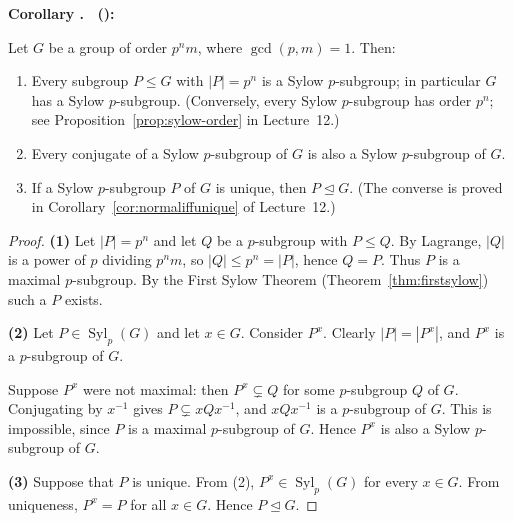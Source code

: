 \documentclass[11pt,a4paper]{article}
\DeclareMathOperator{\Syl}{Syl}
\newcounter{thmcnt}[section]
\renewcommand{\thethmcnt}{\thesection.\arabic{thmcnt}}
\newenvironment{corollary}[1][]{
	\def\temp{#1}%
    \refstepcounter{thmcnt}
	\begin{corollarybox}
		\textbf{\color{corollaryColor}Corollary \thethmcnt%
			\ifx\temp\empty\relax\else\ (#1)\fi:} 
	}{
	\end{corollarybox}
}
\begin{document}
	
	\begin{corollary}
		\label{cor:sylowprops}
		Let $G$ be a group of order $p^n m$, where $\gcd(p, m) = 1$. Then:
		\begin{enumerate}
			\item Every subgroup $P \leq G$ with $|P| = p^n$ is a Sylow $p$-subgroup; in particular $G$ has a Sylow $p$-subgroup. (Conversely, every Sylow $p$-subgroup has order $p^n$; see Proposition~\ref{prop:sylow-order} in Lecture~12.)
			\item Every conjugate of a Sylow $p$-subgroup of $G$ is also a Sylow $p$-subgroup of $G$.
			\item If a Sylow $p$-subgroup $P$ of $G$ is unique, then $P \trianglelefteq G$. (The converse is proved in Corollary~\ref{cor:normaliffunique} of Lecture~12.)
		\end{enumerate}
	\end{corollary}
	
	\begin{proof}
		\textbf{(1)} Let $|P| = p^n$ and let $Q$ be a $p$-subgroup with $P \le Q$. By Lagrange, $|Q|$ is a power of $p$ dividing $p^n m$, so $|Q| \le p^n = |P|$, hence $Q = P$. Thus $P$ is a maximal $p$-subgroup. By the First Sylow Theorem (Theorem~\ref{thm:firstsylow}) such a $P$ exists.
		
		\vspace{0.5em}
		\noindent \textbf{(2)} Let $P \in \Syl_p(G)$ and let $x \in G$. Consider $P^x$. Clearly $|P| = |P^x|$, and $P^x$ is a $p$-subgroup of $G$.
		
		\noindent Suppose $P^x$ were not maximal: then $P^x \subsetneq Q$ for some $p$-subgroup $Q$ of $G$. Conjugating by $x^{-1}$ gives $P \subsetneq x Q x^{-1}$, and $xQx^{-1}$ is a $p$-subgroup of $G$. This is impossible, since $P$ is a maximal $p$-subgroup of $G$. Hence $P^x$ is also a Sylow $p$-subgroup of $G$.
		
		\vspace{0.5em}
		\noindent \textbf{(3)} Suppose that $P$ is unique. From (2), $P^x \in \Syl_p(G)$ for every $x \in G$. From uniqueness, $P^x = P$ for all $x \in G$. Hence $P \trianglelefteq G$.
	\end{proof}
\end{document}
